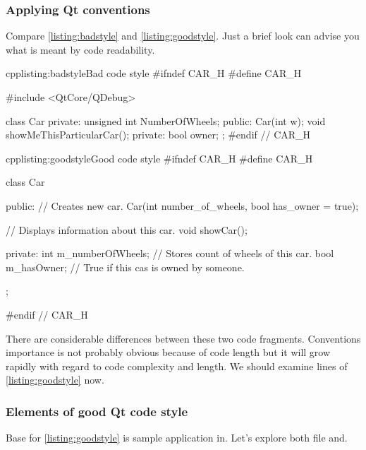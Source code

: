 \subsubsection{Applying Qt conventions}
Compare \autoref{listing:badstyle} and \autoref{listing:goodstyle}. Just a brief look can advise you what is meant by code readability.
\begin{fdoccode}{cpp}{listing:badstyle}{Bad code style}
#ifndef CAR_H
#define CAR_H

#include <QtCore/QDebug>


class Car {
    private:
		unsigned int NumberOfWheels;
    public:
		Car(int w);
		void showMeThisParticularCar();
    private:
		bool owner;
};
#endif // CAR_H
\end{fdoccode}

\begin{fdoccode}{cpp}{listing:goodstyle}{Good code style}
#ifndef CAR_H
#define CAR_H


class Car {
    public:
		// Creates new car.
		Car(int number_of_wheels, bool has_owner = true);

		// Displays information about this car.
		void showCar();

    private:
		int m_numberOfWheels; // Stores count of wheels of this car.
		bool m_hasOwner; // True if this cas is owned by someone.
};

#endif // CAR_H
\end{fdoccode}

There are considerable differences between these two code fragments. Conventions importance is not probably obvious because of code length but it will grow rapidly with regard to code complexity and length. We should examine lines of \autoref{listing:goodstyle} now.

\subsubsection{Elements of good Qt code style}
Base for \autoref{listing:goodstyle} is sample application in. Let's explore both file and.

